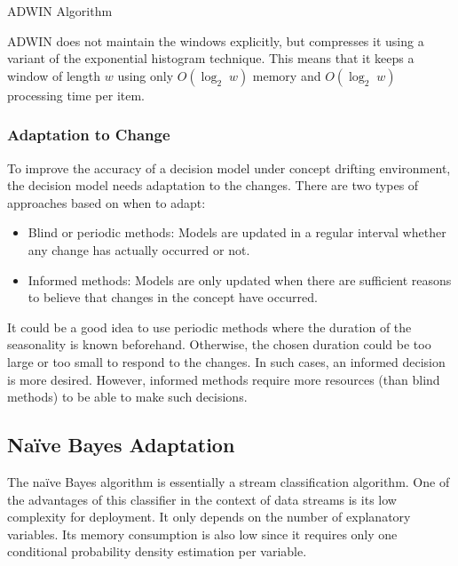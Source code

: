 \begin{algorithm}[htbp]
    \DontPrintSemicolon
\label{alg:adwin}
\caption{ADWIN Algorithm}

\end{algorithm}

ADWIN does not maintain the windows explicitly, but compresses it using a variant of the exponential histogram technique. This means that it keeps a window of length $w$ using only $O(\log_2\;w)$ memory and $O(\log_2\;w)$ processing time per item.

\subsubsection{Adaptation to Change}
To improve the accuracy of a decision model under concept drifting environment, the decision model needs adaptation to the changes. There are two types of approaches based on when to adapt: 
\begin{itemize}    
    \item Blind or periodic methods: Models are updated in a regular interval whether any change has actually occurred or not. 
    \item Informed methods: Models are only updated when there are sufficient reasons to believe that changes in the concept have occurred.
\end{itemize}
It could be a good idea to use periodic methods where the duration of the seasonality is known beforehand. Otherwise, the chosen duration could be too large or too small to respond to the changes. In such cases, an informed decision is more desired. However, informed methods require more resources (than blind methods) to be able to make such decisions.

\subsection{Na\"ive Bayes Adaptation}
The na\"ive Bayes algorithm is essentially a stream classification algorithm. One of the advantages of this classifier in the context of data streams is its low complexity for deployment. It only depends on the number of explanatory variables. Its memory consumption is also low since it requires only one conditional probability density estimation per variable.

